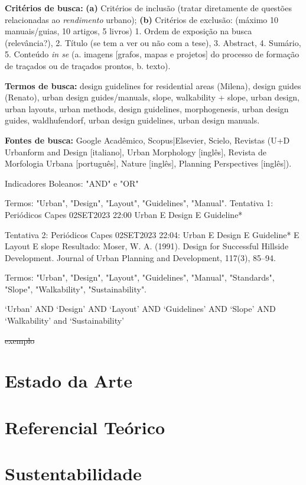 \documentclass[]{report}
\begin{document}
					\textbf{Critérios de busca:} \textbf{(a)} Critérios de inclusão (tratar diretamente de questões relacionadas ao \textit{rendimento} urbano); \textbf{(b)} Critérios de exclusão: (máximo 10 manuais/guias, 10 artigos, 5 livros) 1. Ordem de exposição na busca (relevância?), 2. Título (se tem a ver ou não com a tese), 3. Abstract, 4. Sumário, 5. Conteúdo \textit{in se} (a. imagens [grafos, mapas e projetos] do processo de formação de traçados ou de traçados prontos, b. texto).

					\textbf{Termos de busca:} design guidelines for residential areas (Milena), design guides (Renato), urban design guides/manuals, slope, walkability + slope, urban design, urban layouts, urban methods, design guidelines, morphogenesis, urban design guides, waldhufendorf, urban design guidelines, urban design manuals.

					\textbf{Fontes de busca:} Google Acadêmico, Scopus|Elsevier, Scielo, Revistas (U+D Urbanform and Design [italiano], Urban Morphology [inglês], Revista de Morfologia Urbana [português], Nature [inglês], Planning Perspectives [inglês]).

					Indicadores Boleanos: "AND" e "OR"

					Termos: "Urban", "Design", "Layout", "Guidelines", "Manual".
					Tentativa 1: Periódicos Capes 02SET2023 22:00 Urban E Design E Guideline*


					Tentativa 2: Periódicos Capes 02SET2023 22:04: Urban E Design E Guideline* E Layout E slope
					Resultado: Moser, W. A. (1991). Design for Successful Hillside Development. Journal of Urban Planning and Development, 117(3), 85–94.

					Termos: "Urban", "Design", "Layout", "Guidelines", "Manual", "Standards", "Slope", "Walkability", "Sustainability".

					`Urban' AND `Design' AND `Layout' AND `Guidelines' AND `Slope' AND `Walkability' and `Sustainability'

				


			\sout{exemplo}
	\section{Estado da Arte}
	\section{Referencial Teórico}
	\section{Sustentabilidade}
\end{document}
